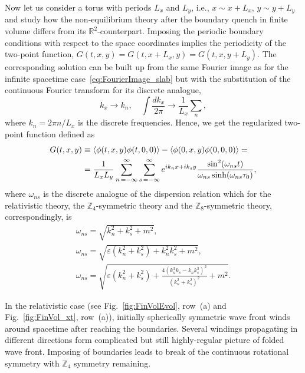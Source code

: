 \documentclass[a4paper,12pt]{article}
\newcommand{\be}{\begin{equation}}
\newcommand{\ee}{\end{equation}}
\newcommand{\skipline}{\vspace{\baselineskip}}
\DeclarePairedDelimiter\corrfunc{\langle}{\rangle}
\newcommand{\eps}{\varepsilon}
\newcommand{\om}{\omega}
\newcommand{\Z}[1]{\mathbb{Z}_{#1}}
\newcommand{\figref}[1]{Fig.~\ref{#1}}
\begin{document}
Now let us consider a torus with periods $L_x$ and $L_y$, i.e., $x \sim x + L_x$, $y \sim y + L_y$ and study how the non-equilibrium theory after the boundary quench in finite volume differs from its $\mathbb{R}^2$-counterpart. Imposing the periodic boundary conditions with respect to the space coordinates implies the periodicity of the two-point function, $G(t, x, y) = G(t, x + L_x, y) = G(t, x, y + L_y)$. The corresponding solution can be built up from the same Fourier image as for the infinite spacetime case~\eqref{eq:FourierImage_slab} but with the substitution of the continuous Fourier transform for its discrete analogue,
\be
    k_x \to k_n, \quad \int\frac{dk_x}{2\pi} \to \frac{1}{L_x}\sum_n,
\ee
where $k_n = 2\pi n/L_x$ is the discrete frequencies. Hence, we get the regularized two-point function defined as
\be
    \begin{aligned}
        G(t, x, y) & \equiv \corrfunc{\phi(t, x, y)\phi(t, 0, 0)} - \corrfunc{\phi(0, x, y)\phi(0, 0, 0)} = \\ 
        & = \frac{1}{L_x L_y}\sum_{n\,= -\infty}^{\infty}\sum_{s\,= -\infty}^{\infty} e^{ik_n x + ik_s y}\frac{\sin^2(\om_{ns} t)}{\om_{ns}\sinh(\om_{ns}\tau_0)},
    \end{aligned}
    \label{eq:G_slab_finvol}
\ee
where $\om_{ns}$ is the discrete analogue of the dispersion relation which for the relativistic theory, the $\Z4$-symmetric theory and the $\Z8$-symmetric theory, correspondingly, is
\begin{gather}
    \om_{ns} = \sqrt{k_n^2 + k_s^2 + m^2}, \\
    \om_{ns} = \sqrt{\eps(k_n^2 + k_s^2) + k_n^2 k_s^2 + m^2}, \\
    \om_{ns} = \sqrt{\eps(k_n^2 + k_s^2) + \frac{4\left(k_n^3 k_s - k_n k_s^3\right)^2}{\left(k_n^2 + k_s^2\right)^2} + m^2}.
\end{gather}

\skipline

In the relativistic case (see \figref{fig:FinVolEvol}, row~(a) and \figref{fig:FinVol_xt}, row~(a)), initially spherically symmetric wave front winds around spacetime after reaching the boundaries. Several windings propagating in different directions form complicated but still highly-regular picture of folded wave front. Imposing of boundaries leads to break of the continuous rotational symmetry with $\Z4$ symmetry remaining.
\end{document}
